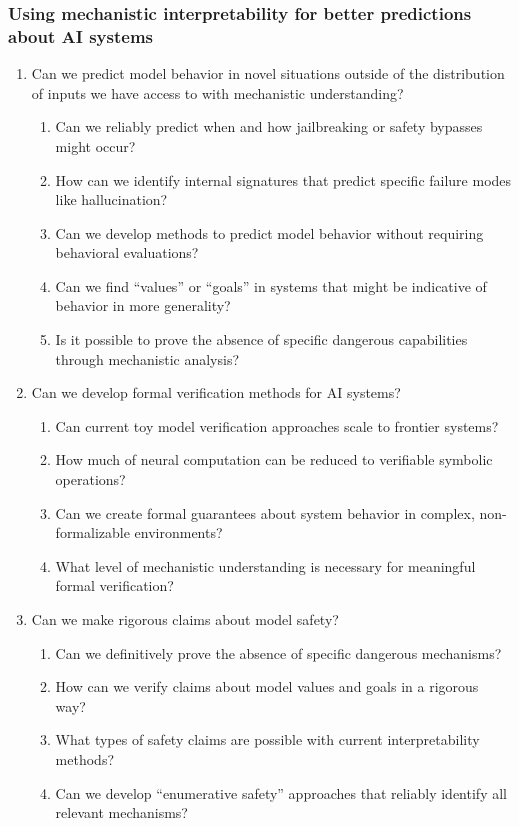 \subsubsection{Using mechanistic interpretability for better predictions about AI systems}
\begin{enumerate}
    \item Can we predict model behavior in novel situations outside of the distribution of inputs we have access to with mechanistic understanding?
    \begin{enumerate}[label=\alph*.]
        \item Can we reliably predict when and how jailbreaking or safety bypasses might occur?
        \item How can we identify internal signatures that predict specific failure modes like hallucination?
        \item Can we develop methods to predict model behavior without requiring behavioral evaluations?
        \item Can we find “values” or “goals” in systems that might be indicative of behavior in more generality?
        \item Is it possible to prove the absence of specific dangerous capabilities through mechanistic analysis?
    \end{enumerate}
    
    \item Can we develop formal verification methods for AI systems?
    \begin{enumerate}[label=\alph*.]
        \item Can current toy model verification approaches scale to frontier systems?
        \item How much of neural computation can be reduced to verifiable symbolic operations?
        \item Can we create formal guarantees about system behavior in complex, non-formalizable environments?
        \item What level of mechanistic understanding is necessary for meaningful formal verification?
    \end{enumerate}
    
    \item Can we make rigorous claims about model safety?
    \begin{enumerate}[label=\alph*.]
        \item Can we definitively prove the absence of specific dangerous mechanisms?
        \item How can we verify claims about model values and goals in a rigorous way?
        \item What types of safety claims are possible with current interpretability methods?
        \item Can we develop “enumerative safety” approaches that reliably identify all relevant mechanisms?
    \end{enumerate}
    

\end{enumerate}

